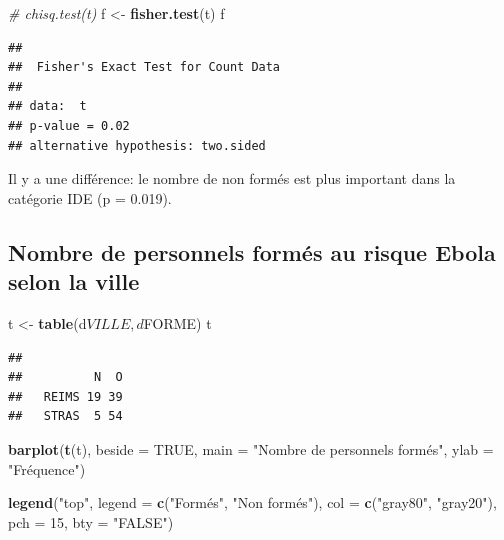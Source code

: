 \documentclass[]{article}
\newenvironment{Shaded}{\begin{snugshade}}{\end{snugshade}}
\newcommand{\KeywordTok}[1]{\textcolor[rgb]{0.13,0.29,0.53}{\textbf{{#1}}}}
\newcommand{\DataTypeTok}[1]{\textcolor[rgb]{0.13,0.29,0.53}{{#1}}}
\newcommand{\DecValTok}[1]{\textcolor[rgb]{0.00,0.00,0.81}{{#1}}}
\newcommand{\StringTok}[1]{\textcolor[rgb]{0.31,0.60,0.02}{{#1}}}
\newcommand{\CommentTok}[1]{\textcolor[rgb]{0.56,0.35,0.01}{\textit{{#1}}}}
\newcommand{\OtherTok}[1]{\textcolor[rgb]{0.56,0.35,0.01}{{#1}}}
\newcommand{\NormalTok}[1]{{#1}}
\begin{document}
\begin{Shaded}
\begin{Highlighting}[]
\CommentTok{# chisq.test(t)}
\NormalTok{f <-}\StringTok{ }\KeywordTok{fisher.test}\NormalTok{(t)}
\NormalTok{f}
\end{Highlighting}
\end{Shaded}

\begin{verbatim}
## 
##  Fisher's Exact Test for Count Data
## 
## data:  t
## p-value = 0.02
## alternative hypothesis: two.sided
\end{verbatim}

Il y a une différence: le nombre de non formés est plus important dans
la catégorie IDE (p = 0.019).

\subsection{Nombre de personnels formés au risque Ebola selon la
ville}\label{nombre-de-personnels-formes-au-risque-ebola-selon-la-ville}

\begin{Shaded}
\begin{Highlighting}[]
\NormalTok{t <-}\StringTok{ }\KeywordTok{table}\NormalTok{(d$VILLE , d$FORME)}
\NormalTok{t}
\end{Highlighting}
\end{Shaded}

\begin{verbatim}
##        
##          N  O
##   REIMS 19 39
##   STRAS  5 54
\end{verbatim}

\begin{Shaded}
\begin{Highlighting}[]
\KeywordTok{barplot}\NormalTok{(}\KeywordTok{t}\NormalTok{(t), }\DataTypeTok{beside =} \OtherTok{TRUE}\NormalTok{, }\DataTypeTok{main =} \StringTok{"Nombre de personnels formés"}\NormalTok{, }\DataTypeTok{ylab =} \StringTok{"Fréquence"}\NormalTok{)}

\KeywordTok{legend}\NormalTok{(}\StringTok{"top"}\NormalTok{, }\DataTypeTok{legend =} \KeywordTok{c}\NormalTok{(}\StringTok{"Formés"}\NormalTok{, }\StringTok{"Non formés"}\NormalTok{), }\DataTypeTok{col =} \KeywordTok{c}\NormalTok{(}\StringTok{"gray80"}\NormalTok{, }\StringTok{"gray20"}\NormalTok{), }\DataTypeTok{pch =} \DecValTok{15}\NormalTok{, }\DataTypeTok{bty =} \StringTok{"FALSE"}\NormalTok{)}
\end{Highlighting}
\end{Shaded}
\end{document}
